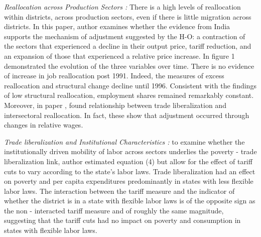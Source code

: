 \documentclass[a4paper,12pt]{article}
\begin{document}
\textit{Reallocation across Production Sectors : }  There is a high levels of reallocation within districts, across production sectors, even if there is little migration across districts.  In this paper, author  examines whether the evidence from India supports the mechanism of adjustment suggested by the H-O:  a contraction of the sectors that experienced a decline in their output price, tariff reduction, and an expansion of those that experienced a relative price increase.  In figure 1 demonstrated the evolution of the three variables over time. There is no evidence of increase in job reallocation post 1991. Indeed, the measures of excess reallocation and structural change decline until 1996. Consistent with the findings  of low structural reallocation, employment shares remained remarkably constant.  Moreover, in paper \cite{Currie1997}, found relationship between trade liberalization and intersectoral  reallocation. In fact, these show that adjustment occurred through changes in relative wages. 

\textit{Trade liberalization and Institutional Characteristics  : }  to examine whether the institutionally driven mobility of labor across sectors underlies the poverty - trade liberalization link, author estimated equation (4) but allow for the effect of tariff cuts to vary according to the state's labor laws.  Trade liberalization had an effect on poverty and per capita expenditures predominantly in states with less flexible labor laws. The interaction between the tariff measure and the indicator of whether the district is in a state with flexible labor laws is of the opposite sign as the non - interacted tariff measure and of roughly the same magnitude, suggesting that the tariff cuts had no impact on poverty and consumption in states with flexible labor laws. 
\end{document}
